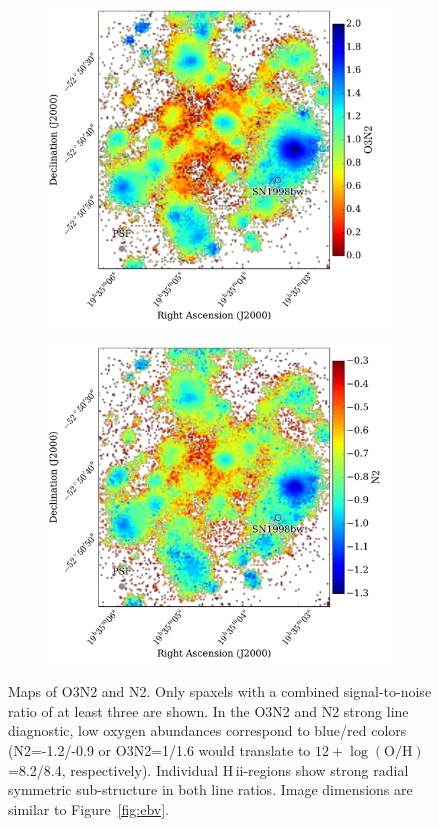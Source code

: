\documentclass[traditabstract]{aa}
\newcommand{\hii}{\mbox{H\,{\sc ii}}}
\newcommand{\oh}{$12+\log(\mathrm{O/H})$}
\begin{document}
\begin{figure}
\begin{subfigure}{.24\textwidth}
  \includegraphics[width=0.999\linewidth]{Figs/MUSE_SN1998bw_O3N2.pdf}
\end{subfigure}
\begin{subfigure}{.24\textwidth}
  \includegraphics[width=0.999\linewidth]{Figs/MUSE_SN1998bw_N2.pdf}
\end{subfigure}
\caption{Maps of O3N2 and N2. Only spaxels with a combined signal-to-noise ratio of at least three are shown. In the O3N2 and N2 strong line diagnostic, low oxygen abundances correspond to blue/red colors (N2=-1.2/-0.9 or  O3N2=1/1.6 would translate to \oh=8.2/8.4, respectively). Individual \hii-regions show strong radial symmetric sub-structure in both line ratios. Image dimensions are similar to Figure~\ref{fig:ebv}.}
\label{fig:o3n2}
\end{figure}
\end{document}
